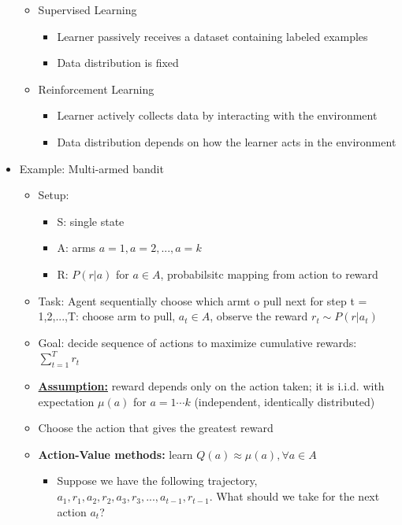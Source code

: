 \documentclass[10pt, oneside]{article}
\begin{document}
\begin{itemize}
    \begin{itemize}
        \item Supervised Learning
        \begin{itemize}
            \item Learner passively receives a dataset containing labeled examples
            \item Data distribution is fixed
        \end{itemize}
        \item Reinforcement Learning
        \begin{itemize}
            \item Learner actively collects data by interacting with the environment
            \item Data distribution depends on how the learner acts in the environment
        \end{itemize}
    \end{itemize}
    \item Example: Multi-armed bandit
    \begin{itemize}
        \item Setup:
        \begin{itemize}
            \item S: single state
            \item A: arms $a=1,a=2,..., a=k$
            \item R: $P(r|a)$ for $a\in A$, probabilsitc mapping from action to reward
        \end{itemize}
        \item Task: Agent sequentially choose which armt o pull next for step t = 1,2,...,T: choose arm to pull, $a_t \in A$, observe the reward $r_t \sim P(r|a_t)$
        \item Goal: decide sequence of actions to maximize cumulative rewards: $\sum_{t=1}^T r_t$
        \item \underline{\textbf{Assumption:}} reward depends only on the action taken; it is i.i.d. with expectation $\mu(a)$ for $a=1\cdots k$ (independent, identically distributed)
        \item Choose the action that gives the greatest reward
        \item \textbf{Action-Value methods:} learn $Q(a) \approx \mu (a), \forall a\in A$
        \begin{itemize}
            \item Suppose we have the following trajectory, $a_1, r_1, a_2 ,r_2, a_3, r_3, ..., a_{t-1}, r_{t-1}$. What should we take for the next action $a_t$?

\end{itemize}
\end{itemize}
\end{itemize}
\end{document}
